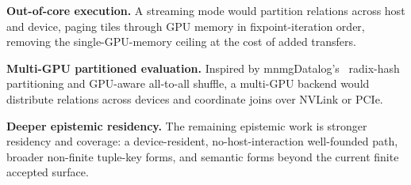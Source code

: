 \textbf{Out-of-core execution.} A streaming mode would partition relations across host and device, paging tiles through GPU memory in fixpoint-iteration order, removing the single-GPU-memory ceiling at the cost of added transfers.

\textbf{Multi-GPU partitioned evaluation.} Inspired by mnmgDatalog's~\cite{mnmgdatalog} radix-hash partitioning and GPU-aware all-to-all shuffle, a multi-GPU backend would distribute relations across devices and coordinate joins over NVLink or PCIe.

\textbf{Deeper epistemic residency.} The remaining epistemic work is stronger residency and coverage: a device-resident, no-host-interaction well-founded path, broader non-finite tuple-key forms, and semantic forms beyond the current finite accepted surface.
